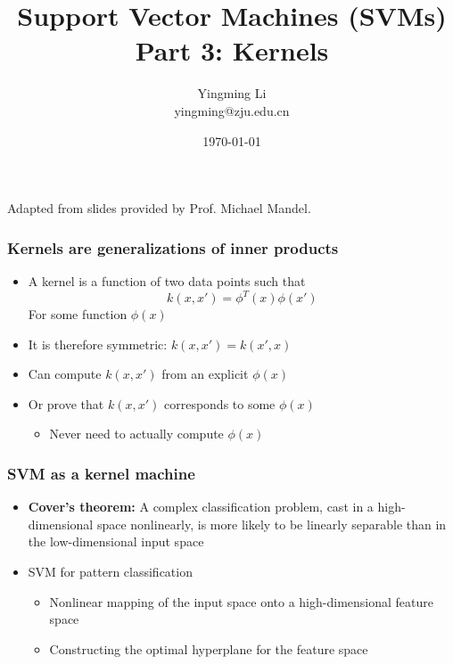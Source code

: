 \documentclass[12pt,notes,mathserif]{beamer}
\title{Support Vector Machines (SVMs) \\Part 3: Kernels}
\author[YingmingLi]{Yingming Li \\ yingming@zju.edu.cn}
\institute[DSERC, ZJU]{Data Science \& Engineering Research Center, ZJU}
\date[\today]{\today}
\begin{document}

\begin{frame}[c]
	\titlepage
	\begin{center}
		Adapted from slides provided by Prof. Michael Mandel.
	\end{center}
\end{frame}

\begin{frame}[c]
\frametitle{Kernels are generalizations of inner products}
\begin{itemize}
\item A kernel is a function of two data points such that
\[
k(x,x')=\phi^T(x)\phi(x')
\]
For some function $\phi(x)$
\item It is therefore symmetric: $k(x,x')=k(x',x)$
\item Can compute $k(x,x')$ from an explicit $\phi(x)$
\item Or prove that $k(x,x')$ corresponds to some $\phi(x)$
\begin{itemize}
\item Never need to actually compute $\phi(x)$
\end{itemize}
\end{itemize}

\end{frame}


\begin{frame}[c]
\frametitle{SVM as a kernel machine}
\begin{itemize}
\item {\bf Cover's theorem:} A complex classification problem, cast in a high-dimensional space nonlinearly, is more likely to be linearly separable than in the low-dimensional input space

\item SVM for pattern classification
\begin{itemize}
\item Nonlinear mapping of the input space onto a high-dimensional feature space
\item Constructing the optimal hyperplane for the feature space
\end{itemize}

\end{itemize}
\end{frame}
\end{document}

